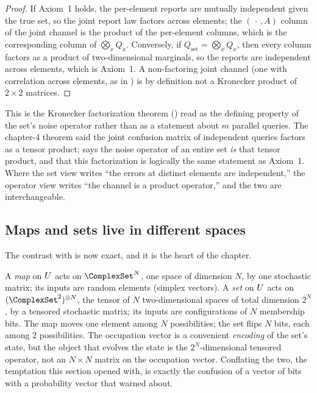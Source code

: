 \begin{proof}
If Axiom~1 holds, the per-element reports are mutually independent given the true
set, so the joint report law factors across elements; the $(\,\cdot\,, A)$
column of the joint channel is the product of the per-element columns, which is
the corresponding column of $\bigotimes_x Q_x$. Conversely, if
$Q_{\mathrm{set}} = \bigotimes_x Q_x$, then every column factors as a product of
two-dimensional marginals, so the reports are independent across elements, which
is Axiom~1. A non-factoring joint channel (one with correlation across elements,
as in ) is by definition not a Kronecker product of
$2 \times 2$ matrices.
\end{proof}

This is the Kronecker factorization theorem () read as the
defining property of the set's noise operator rather than as a statement about
$m$ parallel queries. The chapter-4 theorem said the joint confusion matrix of
independent queries factors as a tensor product; 
says the noise operator of an entire set \emph{is} that tensor product, and
that this factorization is logically the same statement as Axiom~1. Where the
set view writes ``the errors at distinct elements are independent,'' the
operator view writes ``the channel is a product operator,'' and the two are
interchangeable.

\subsection*{Maps and sets live in different spaces}

The contrast with  is now exact, and it is
the heart of the chapter.

A \emph{map} on $U$ acts on $\ComplexSet^{N}$, one space of dimension
$N$, by one stochastic matrix; its inputs are random elements (simplex
vectors). A \emph{set} on $U$ acts on $(\ComplexSet^{2})^{\otimes N}$,
the tensor of $N$ two-dimensional spaces of total dimension $2^{N}$, by a
tensored stochastic matrix; its inputs are configurations of $N$ membership
bits. The map moves one element among $N$ possibilities; the set flips $N$ bits,
each among $2$ possibilities. The occupation vector is a convenient
\emph{encoding} of the set's state, but the object that evolves the state is the
$2^N$-dimensional tensored operator, not an $N \times N$ matrix on the
occupation vector. Conflating the two, the temptation this section opened with,
is exactly the confusion of a vector of bits with a probability vector that
 warned about.

